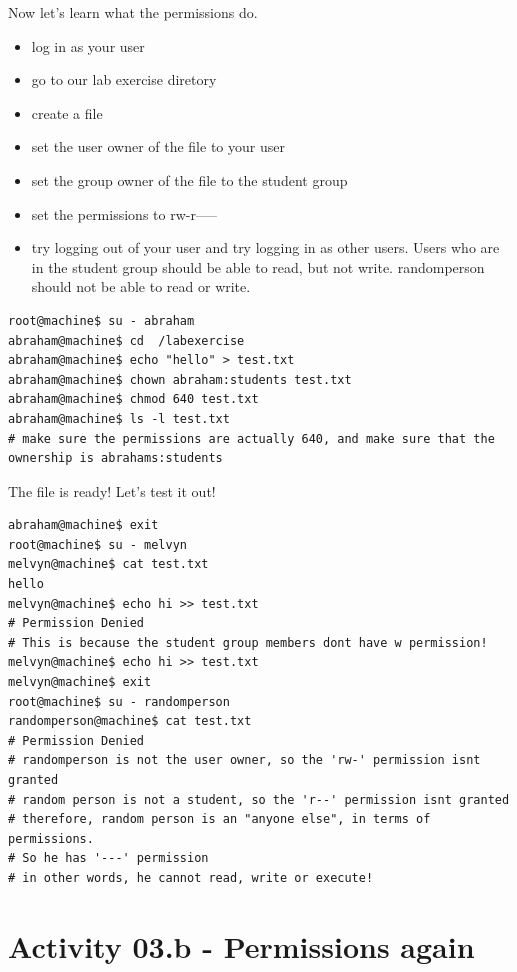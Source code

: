 \documentclass[12pt,a4]{article}
\begin{document}
Now let's learn what the permissions do. 
\begin{itemize}
    \item log in as your user
    \item go to our lab exercise diretory
    \item create a file
    \item set the user owner of the file to your user
    \item set the group owner of the file to the student group
    \item set the permissions to rw-r-----
    \item try logging out of your user and try logging in as other users. Users who are in the student group should be able to read, but not write. randomperson should not be able to read or write.
\end{itemize}


\begin{lstlisting}[style=Term, label=listing:awk, caption={Create a test file}]
root@machine$ su - abraham
abraham@machine$ cd  /labexercise
abraham@machine$ echo "hello" > test.txt
abraham@machine$ chown abraham:students test.txt
abraham@machine$ chmod 640 test.txt
abraham@machine$ ls -l test.txt
# make sure the permissions are actually 640, and make sure that the ownership is abrahams:students
\end{lstlisting}

The file is ready! Let's test it out!

\begin{lstlisting}[style=Term, label=listing:awk, caption={melvyn can read, but not write to the file}]
abraham@machine$ exit
root@machine$ su - melvyn
melvyn@machine$ cat test.txt
hello
melvyn@machine$ echo hi >> test.txt
# Permission Denied
# This is because the student group members dont have w permission!
melvyn@machine$ echo hi >> test.txt
melvyn@machine$ exit
root@machine$ su - randomperson
randomperson@machine$ cat test.txt
# Permission Denied
# randomperson is not the user owner, so the 'rw-' permission isnt granted
# random person is not a student, so the 'r--' permission isnt granted
# therefore, random person is an "anyone else", in terms of permissions. 
# So he has '---' permission
# in other words, he cannot read, write or execute!
\end{lstlisting}


\section {Activity 03.b - Permissions again}
\end{document}

